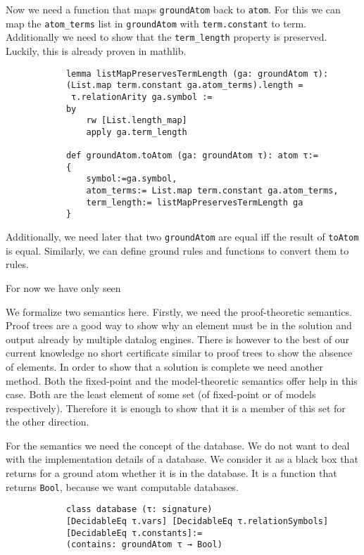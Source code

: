 \documentclass{article}
\begin{document}
        Now we need a function that maps \texttt{groundAtom} back to \texttt{atom}. For this we can map the \texttt{atom\_terms} list in \texttt{groundAtom} with \texttt{term.constant} to term. Additionally we need to show that the \texttt{term\_length} property is preserved. Luckily, this is already proven in mathlib.


        \begin{lstlisting}
            lemma listMapPreservesTermLength (ga: groundAtom τ): 
            (List.map term.constant ga.atom_terms).length = 
             τ.relationArity ga.symbol :=
            by
                rw [List.length_map]
                apply ga.term_length

            def groundAtom.toAtom (ga: groundAtom τ): atom τ:= 
            {
                symbol:=ga.symbol,
                atom_terms:= List.map term.constant ga.atom_terms,
                term_length:= listMapPreservesTermLength ga
            }
        \end{lstlisting}

        Additionally, we need later that two \texttt{groundAtom} are equal iff the result of \texttt{toAtom} is equal. Similarly, we can define ground rules and functions to convert them to rules.

        For now we have only seen 


        We formalize two semantics here. Firstly, we need the proof-theoretic semantics. Proof trees are a good way to show why an element must be in the solution and output already by multiple datalog engines. There is however to the best of our current knowledge no short certificate similar to proof trees to show the absence of elements. In order to show that a solution is complete we need another method. Both the fixed-point and the model-theoretic semantics offer help in this case. Both are the least element of some set (of fixed-point or of models respectively). Therefore it is enough to show that it is a member of this set for the other direction.

        For the semantics we need the concept of the database. We do not want to deal with the implementation details of a database. We consider it as a black box that returns for a ground atom whether it is in the database. It is a function that returns \texttt{Bool}, because we want computable databases.

        \begin{lstlisting}
            class database (τ: signature) 
            [DecidableEq τ.vars] [DecidableEq τ.relationSymbols]
            [DecidableEq τ.constants]:=
            (contains: groundAtom τ → Bool)
        \end{lstlisting}
        
\end{document}
